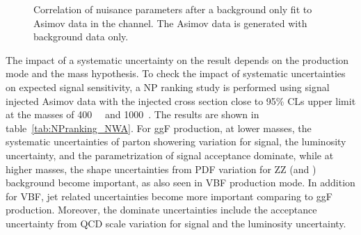 \begin{figure}[!ht]
\begin{center}
\caption{Correlation of nuisance parameters after a background only fit to Asimov data in the \llll channel.
The Asimov data is generated with background data only.
}
\label{fig:NPcorr_cb_asimov}
\end{center}
\end{figure}

The impact of a systematic uncertainty on the result depends on the production mode and the mass hypothesis.
To check the impact of systematic uncertainties on expected signal sensitivity, a NP ranking study is performed using
signal injected Asimov data with the injected cross section close to 95\% CLs upper limit at the masses of 400~\gev~ and 1000~\gev.
The results are shown in table~\ref{tab:NPranking_NWA}.
For ggF production, at lower masses, the systematic uncertainties of parton showering variation for signal, the luminosity uncertainty, 
and the parametrization of signal acceptance dominate,
while at higher masses, the shape uncertainties from PDF variation for ZZ (\qqZZ and \ggZZ) background become important, as also seen in VBF production mode.
In addition for VBF, jet related uncertainties become more important comparing to ggF production.
Moreover, the dominate uncertainties include the acceptance uncertainty from QCD scale variation for signal and the luminosity uncertainty.

